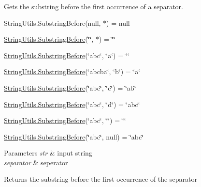 Gets the substring before the first occurrence of a separator. 

String\+Utils.\+Substring\+Before(null, $\ast$) = null 

\hyperlink{class_ultimate_1_1_utilities_1_1_string_utils_a5dd475e3e3e80db3c00acf01fdadee5d}{String\+Utils.\+Substring\+Before}(\char`\"{}\char`\"{}, $\ast$) = \char`\"{}\char`\"{} 

\hyperlink{class_ultimate_1_1_utilities_1_1_string_utils_a5dd475e3e3e80db3c00acf01fdadee5d}{String\+Utils.\+Substring\+Before}(\char`\"{}abc\char`\"{}, \char`\"{}a\char`\"{}) = \char`\"{}\char`\"{} 

\hyperlink{class_ultimate_1_1_utilities_1_1_string_utils_a5dd475e3e3e80db3c00acf01fdadee5d}{String\+Utils.\+Substring\+Before}(\char`\"{}abcba\char`\"{}, \char`\"{}b\char`\"{}) = \char`\"{}a\char`\"{} 

\hyperlink{class_ultimate_1_1_utilities_1_1_string_utils_a5dd475e3e3e80db3c00acf01fdadee5d}{String\+Utils.\+Substring\+Before}(\char`\"{}abc\char`\"{}, \char`\"{}c\char`\"{}) = \char`\"{}ab\char`\"{} 

\hyperlink{class_ultimate_1_1_utilities_1_1_string_utils_a5dd475e3e3e80db3c00acf01fdadee5d}{String\+Utils.\+Substring\+Before}(\char`\"{}abc\char`\"{}, \char`\"{}d\char`\"{}) = \char`\"{}abc\char`\"{} 

\hyperlink{class_ultimate_1_1_utilities_1_1_string_utils_a5dd475e3e3e80db3c00acf01fdadee5d}{String\+Utils.\+Substring\+Before}(\char`\"{}abc\char`\"{}, \char`\"{}\char`\"{}) = \char`\"{}\char`\"{} 

\hyperlink{class_ultimate_1_1_utilities_1_1_string_utils_a5dd475e3e3e80db3c00acf01fdadee5d}{String\+Utils.\+Substring\+Before}(\char`\"{}abc\char`\"{}, null) = \char`\"{}abc\char`\"{} 


\begin{DoxyParams}{Parameters}
{\em str} & input string\\
\hline
{\em separator} & seperator\\
\hline
\end{DoxyParams}
\begin{DoxyReturn}{Returns}
the substring before the first occurrence of the separator
\end{DoxyReturn}
